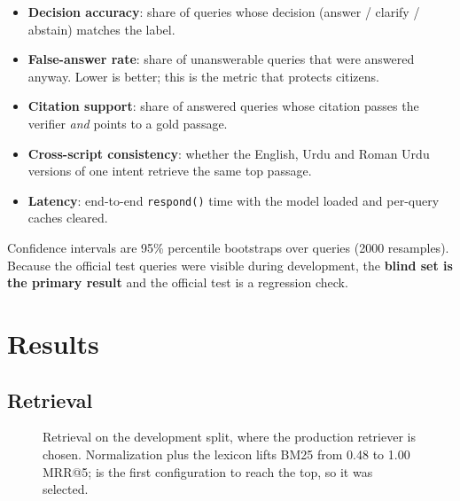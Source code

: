 \documentclass[11pt,a4paper]{article}
\def\addplotcoords#1#2{\expandafter\addplotcoordsi\expandafter{#2}{#1}}
\def\addplotcoordsi#1#2{\addplot[#2] coordinates {#1};}
\begin{document}
\begin{itemize}
  \item \textbf{Decision accuracy}: share of queries whose decision (answer / clarify / abstain) matches the label.
  \item \textbf{False-answer rate}: share of unanswerable queries that were answered anyway. Lower is better; this is the
        metric that protects citizens.
  \item \textbf{Citation support}: share of answered queries whose citation passes the verifier \emph{and} points to a gold
        passage.
  \item \textbf{Cross-script consistency}: whether the English, Urdu and Roman Urdu versions of one intent retrieve the same top
        passage.
  \item \textbf{Latency}: end-to-end \texttt{respond()} time with the model loaded and per-query caches cleared.
\end{itemize}
Confidence intervals are 95\% percentile bootstraps over queries (2000 resamples). Because the official test queries were
visible during development, the \textbf{blind set is the primary result} and the official test is a regression check.

\section{Results}
\label{sec:results}

\subsection{Retrieval}
\begin{figure}[H]
\centering
{}
\caption{Retrieval on the development split, where the production retriever is chosen. Normalization plus the lexicon lifts
BM25 from 0.48 to 1.00 MRR@5; \FinalMethod{} is the first configuration to reach the top, so it was selected.}
\label{fig:retdev}
\end{figure}
\end{document}
